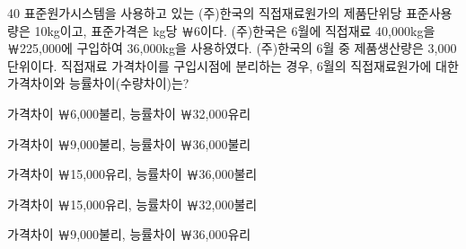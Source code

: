 \begin{question}{40}
표준원가시스템을 사용하고 있는 (주)한국의 직접재료원가의 제품단위당 표준사용량은 10kg이고, 표준가격은 kg당 ￦6이다. (주)한국은 6월에 직접재료 40,000kg을 ￦225,000에 구입하여 36,000kg을 사용하였다. (주)한국의 6월 중 제품생산량은 3,000단위이다. 직접재료 가격차이를 구입시점에 분리하는 경우, 6월의 직접재료원가에 대한 가격차이와 능률차이(수량차이)는?
\begin{choices}
  \item 가격차이 ￦6,000불리, 능률차이 ￦32,000유리
  \item 가격차이 ￦9,000불리, 능률차이 ￦36,000불리
  \item 가격차이 ￦15,000유리, 능률차이 ￦36,000불리
  \item 가격차이 ￦15,000유리, 능률차이 ￦32,000불리
  \item 가격차이 ￦9,000불리, 능률차이 ￦36,000유리
\end{choices}
\end{question}
